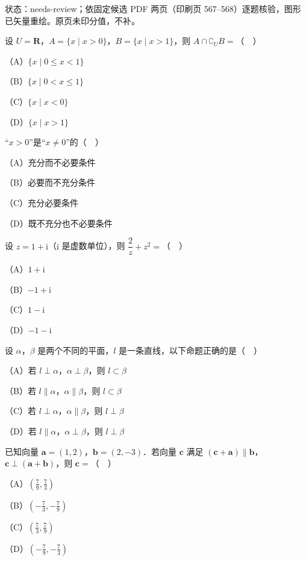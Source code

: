 

状态：needs-review；依固定候选 PDF 两页（印刷页 567–568）逐题核验，图形已矢量重绘。原页未印分值，不补。


\begin{question}
设 $U=\mathbf R$，$A=\{x\mid x>0\}$，$B=\{x\mid x>1\}$，则 $A\cap\complement_U B=$（　）

（A）$\{x\mid 0\leqslant x<1\}$

（B）$\{x\mid 0<x\leqslant 1\}$

（C）$\{x\mid x<0\}$

（D）$\{x\mid x>1\}$

\end{question}
\begin{question}
“$x>0$”是“$x\neq0$”的（　）

（A）充分而不必要条件

（B）必要而不充分条件

（C）充分必要条件

（D）既不充分也不必要条件

\end{question}
\begin{question}
设 $z=1+\mathrm i$（$\mathrm i$ 是虚数单位），则 $\dfrac2z+z^2=$（　）

（A）$1+\mathrm i$

（B）$-1+\mathrm i$

（C）$1-\mathrm i$

（D）$-1-\mathrm i$

\end{question}
\begin{question}
设 $\alpha$，$\beta$ 是两个不同的平面，$l$ 是一条直线，以下命题正确的是（　）

（A）若 $l\perp\alpha$，$\alpha\perp\beta$，则 $l\subset\beta$

（B）若 $l\parallel\alpha$，$\alpha\parallel\beta$，则 $l\subset\beta$

（C）若 $l\perp\alpha$，$\alpha\parallel\beta$，则 $l\perp\beta$

（D）若 $l\parallel\alpha$，$\alpha\perp\beta$，则 $l\perp\beta$

\end{question}
\begin{question}
已知向量 $\boldsymbol a=(1,2)$，$\boldsymbol b=(2,-3)$．若向量 $\boldsymbol c$ 满足 $(\boldsymbol c+\boldsymbol a)\parallel\boldsymbol b$，$\boldsymbol c\perp(\boldsymbol a+\boldsymbol b)$，则 $\boldsymbol c=$（　）

（A）$\left(\frac79,\frac73\right)$

（B）$\left(-\frac73,-\frac79\right)$

（C）$\left(\frac73,\frac79\right)$

（D）$\left(-\frac79,-\frac73\right)$

\end{question}
